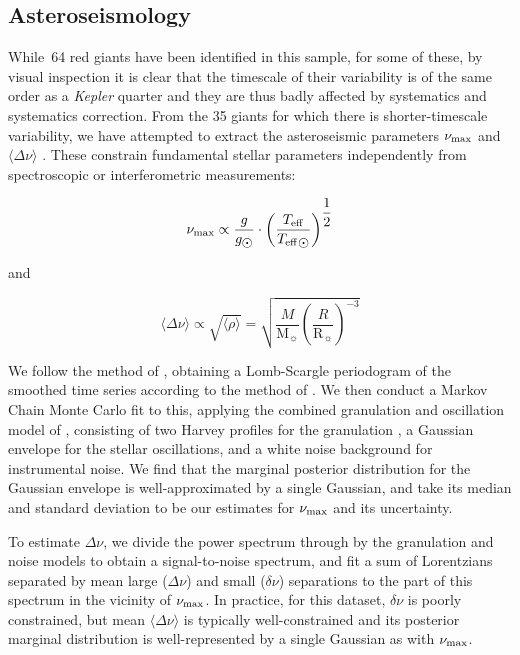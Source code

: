 \documentclass[a4paper,fleqn,usenatbib]{mnras}
\newcommand{\numax}{\mbox{$\nu_{\rm max}$}\xspace}
\newcommand{\Dnu}{\mbox{$\Delta \nu$}\xspace}
\newcommand{\dnu}{\mbox{$\delta \nu$}\xspace}
\newcommand{\teff}{\mbox{$T_{\rm eff}$}\xspace}
\newcommand{\msun}{\mbox{$\mathrm{M}_{\sun}$}\xspace}
\newcommand{\rsun}{\mbox{$\mathrm{R}_{\sun}$}\xspace}
\newcommand{\kepler}{\emph{Kepler}\xspace}
\begin{document}



\subsection{Asteroseismology}
\label{asteroseismology}

While~64 red giants have been identified in this sample, for some of these, by visual inspection it is clear that the timescale of their variability is of the same order as a \kepler quarter and they are thus badly affected by systematics and systematics correction. From the 35 giants for which there is shorter-timescale variability, we have attempted to extract the asteroseismic parameters \numax and $\langle \Dnu \rangle$ \citep{KB95,2013ARA&A..51..353C}. These constrain fundamental stellar parameters independently from spectroscopic or interferometric measurements: 

\begin{equation}
\label{scaling}
\numax \propto \dfrac{g}{g_{\sun}} \cdot \left(\dfrac{\teff}{\teff_{\sun}}\right)^{\dfrac{1}{2}}
\end{equation}

and

\begin{equation}
\langle \Dnu \rangle \propto \sqrt{\langle \rho \rangle} = \sqrt{\dfrac{M}{\msun} \left(\dfrac{R}{\rsun}\right)^{-3}}
\end{equation}

We follow the method of \citet{2016AN....337..774D}, obtaining a Lomb-Scargle periodogram of the smoothed time series according to the method of \citet{2011MNRAS.414L...6G}. We then conduct a Markov Chain Monte Carlo fit to this, applying the combined granulation and oscillation model of \citet{2014A&A...570A..41K}, consisting of two Harvey profiles for the granulation \citep{1985ESASP.235..199H}, a Gaussian envelope for the stellar oscillations, and a white noise background for instrumental noise. We find that the marginal posterior distribution for the Gaussian envelope is well-approximated by a single Gaussian, and take its median and standard deviation to be our estimates for \numax and its uncertainty.

To estimate \Dnu, we divide the power spectrum through by the granulation and noise models to obtain a signal-to-noise spectrum, and fit a sum of Lorentzians separated by mean large (\Dnu) and small (\dnu) separations to the part of this spectrum in the vicinity of \numax. In practice, for this dataset, \dnu is poorly constrained, but mean $\langle \Dnu \rangle$ is typically well-constrained and its posterior marginal distribution is well-represented by a single Gaussian as with \numax. 
\end{document}

